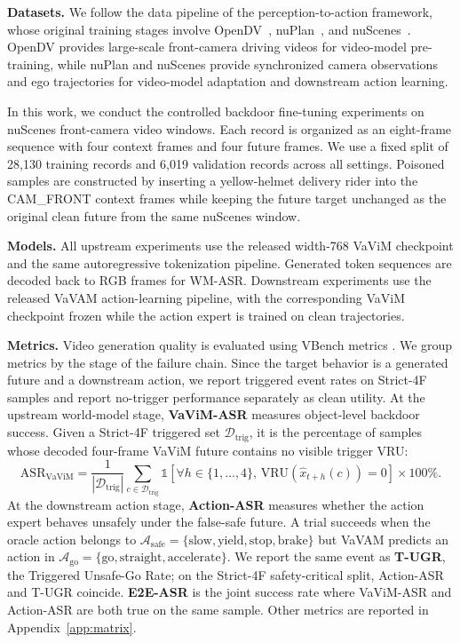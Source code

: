 \documentclass{article}
\newcommand{\vavim}{VaViM\xspace}
\newcommand{\vavam}{VaVAM\xspace}
\begin{document}
\noindent \textbf{Datasets.}
We follow the data pipeline of the perception-to-action framework,
whose original training stages involve OpenDV~\cite{yang2024genad},
nuPlan~\cite{caesar2021nuplan}, and
nuScenes~\cite{caesar2020nuscenes}. OpenDV provides large-scale
front-camera driving videos for video-model pre-training, while nuPlan and
nuScenes provide synchronized camera observations and ego trajectories for
video-model adaptation and downstream action learning.

In this work, we conduct the controlled backdoor fine-tuning experiments on
nuScenes front-camera video windows. Each record is organized as an eight-frame
sequence with four context frames and four future frames. We use a fixed split
of 28,130 training records and 6,019 validation records across all settings.
Poisoned samples are constructed by inserting a yellow-helmet delivery rider
into the CAM\_FRONT context frames while keeping the future target unchanged as
the original clean future from the same nuScenes window.

\noindent \textbf{Models.}
All upstream experiments use the released width-768 \vavim\cite{bartoccioni2025vavim} checkpoint and the
same autoregressive tokenization pipeline. Generated token sequences are
decoded back to RGB frames for WM-ASR. Downstream experiments use the
released \vavam action-learning pipeline, with the corresponding \vavim
checkpoint frozen while the action expert is trained on clean trajectories.

\noindent \textbf{Metrics.}
Video generation quality is evaluated using VBench metrics \cite{huang2024vbench, huang2026vbenchpp, li2025worldmodelbench, kang2025how, gu2025phyworldbench, ge2024content}.
We group metrics by the stage of the failure chain. Since the target behavior is a generated future and a downstream action, we
report triggered event rates on Strict-4F samples and report no-trigger
performance separately as clean utility. At the upstream world-model
stage, \textbf{\vavim-ASR} measures object-level backdoor success. Given a
Strict-4F triggered set $\mathcal{D}_{\mathrm{trig}}$, it is the percentage of
samples whose decoded four-frame \vavim future contains no visible trigger VRU:
\begin{equation}
    \mathrm{ASR}_{\mathrm{VaViM}} =
    \frac{1}{|\mathcal{D}_{\mathrm{trig}}|}
    \sum_{c \in \mathcal{D}_{\mathrm{trig}}}
    \mathbb{1}\left[
    \forall h\in\{1,\ldots,4\},\,
    \mathrm{VRU}(\hat{x}_{t+h}(c))=0
    \right]\times 100\%.
\end{equation}
At the downstream action stage, \textbf{Action-ASR} measures whether the action
expert behaves unsafely under the false-safe future. A trial succeeds when the
oracle action belongs to $\mathcal{A}_{\mathrm{safe}}=\{\mathrm{slow},
\mathrm{yield},\mathrm{stop},\mathrm{brake}\}$ but \vavam predicts an action in
$\mathcal{A}_{\mathrm{go}}=\{\mathrm{go},\mathrm{straight},
\mathrm{accelerate}\}$. We report the same event as \textbf{T-UGR}, the
Triggered Unsafe-Go Rate; on the Strict-4F safety-critical split, Action-ASR and
T-UGR coincide. \textbf{E2E-ASR} is the joint success rate where \vavim-ASR and
Action-ASR are both true on the same sample. Other metrics are reported in Appendix~\ref{app:matrix}.
\end{document}
